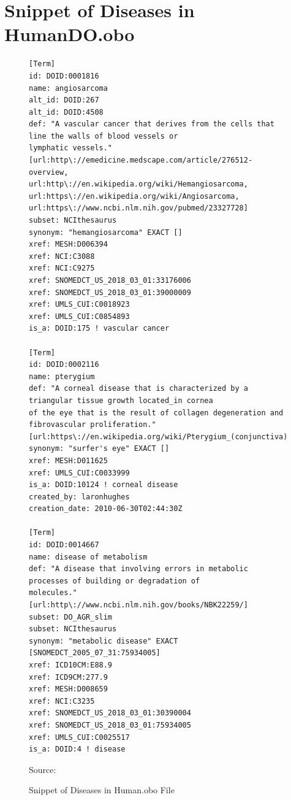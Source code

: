 \chapter{Snippet of Diseases in HumanDO.obo}
\label{Anhang_SnippetDiseases}
\begin{figure}[H]
\centering
\begin{lstlisting}[]
[Term]
id: DOID:0001816
name: angiosarcoma
alt_id: DOID:267
alt_id: DOID:4508
def: "A vascular cancer that derives from the cells that line the walls of blood vessels or
lymphatic vessels." [url:http\://emedicine.medscape.com/article/276512-overview, 
url:http\://en.wikipedia.org/wiki/Hemangiosarcoma, 
url:https\://en.wikipedia.org/wiki/Angiosarcoma, 
url:https\://www.ncbi.nlm.nih.gov/pubmed/23327728]
subset: NCIthesaurus
synonym: "hemangiosarcoma" EXACT []
xref: MESH:D006394
xref: NCI:C3088
xref: NCI:C9275
xref: SNOMEDCT_US_2018_03_01:33176006
xref: SNOMEDCT_US_2018_03_01:39000009
xref: UMLS_CUI:C0018923
xref: UMLS_CUI:C0854893
is_a: DOID:175 ! vascular cancer

[Term]
id: DOID:0002116
name: pterygium
def: "A corneal disease that is characterized by a triangular tissue growth located_in cornea
of the eye that is the result of collagen degeneration and fibrovascular proliferation."
[url:https\://en.wikipedia.org/wiki/Pterygium_(conjunctiva)]
synonym: "surfer's eye" EXACT []
xref: MESH:D011625
xref: UMLS_CUI:C0033999
is_a: DOID:10124 ! corneal disease
created_by: laronhughes
creation_date: 2010-06-30T02:44:30Z

[Term]
id: DOID:0014667
name: disease of metabolism
def: "A disease that involving errors in metabolic processes of building or degradation of
molecules." [url:http\://www.ncbi.nlm.nih.gov/books/NBK22259/]
subset: DO_AGR_slim
subset: NCIthesaurus
synonym: "metabolic disease" EXACT [SNOMEDCT_2005_07_31:75934005]
xref: ICD10CM:E88.9
xref: ICD9CM:277.9
xref: MESH:D008659
xref: NCI:C3235
xref: SNOMEDCT_US_2018_03_01:30390004
xref: SNOMEDCT_US_2018_03_01:75934005
xref: UMLS_CUI:C0025517
is_a: DOID:4 ! disease
\end{lstlisting}
\caption{Snippet of Diseases in Human.obo File}
Source: \citep{do}
\end{figure}


